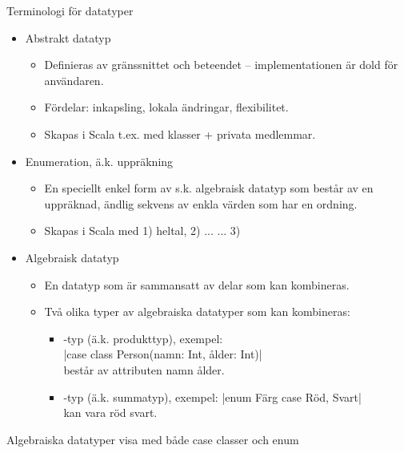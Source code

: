 
\begin{Slide}{Terminologi för datatyper}\SlideFontSmall
\begin{itemize}
\item Abstrakt datatyp 
\begin{itemize}\SlideFontTiny
\item Definieras av gränssnittet och beteendet -- implementationen är dold för användaren. 
\item Fördelar: inkapsling, lokala ändringar, flexibilitet.
\item Skapas i Scala t.ex. med klasser + privata medlemmar.
\end{itemize} 
\item Enumeration, ä.k. uppräkning 
\begin{itemize}\SlideFontTiny
\item En speciellt enkel form av s.k. algebraisk datatyp som består av en uppräknad, ändlig sekvens av enkla värden som har en ordning.
\item Skapas i Scala med 1) heltal, 2)  ...  ... 3) 
\end{itemize} 
\item Algebraisk datatyp 
\begin{itemize}\SlideFontTiny
\item En datatyp som är sammansatt av delar som kan kombineras. 
\item Två olika typer av algebraiska datatyper som kan kombineras:
\begin{itemize}\SlideFontTiny
\item {}-typ (ä.k. produkttyp), exempel: \\ \code|case class Person(namn: Int, ålder: Int)| \\består av attributen namn  ålder.
\item {}-typ (ä.k. summatyp), exempel: \code|enum Färg { case Röd, Svart}| \\kan vara röd  svart.
\end{itemize}  
\end{itemize} 
\end{itemize}     
\end{Slide}


\begin{Slide}{Algebraiska datatyper}
     \TODO visa med både case classer och enum
\end{Slide}